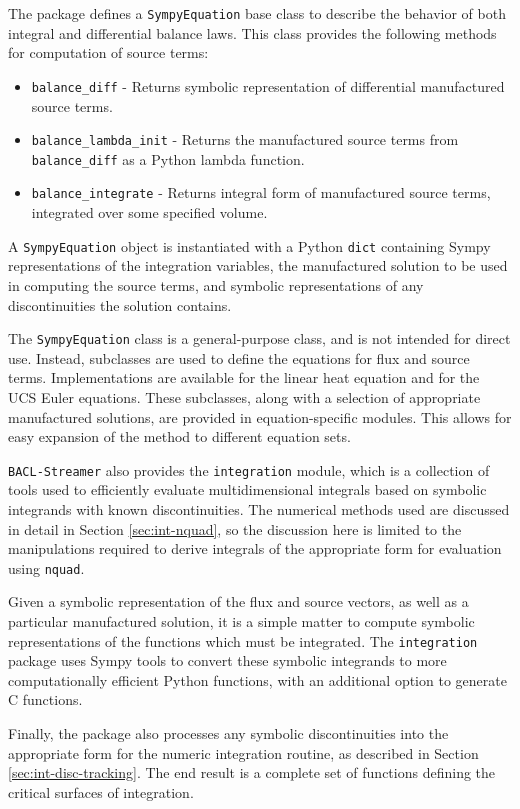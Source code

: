 The package defines a {\tt SympyEquation} base class to describe the behavior of both integral and differential balance laws. This class provides the following methods for computation of source terms:
\begin{itemize}
\item {\tt balance\_diff} - Returns symbolic representation of differential manufactured source terms.
\item {\tt balance\_lambda\_init} - Returns the manufactured source terms from {\tt balance\_diff} as a Python lambda function.
\item {\tt balance\_integrate} - Returns integral form of manufactured source terms, integrated over some specified volume.
\end{itemize}
A {\tt SympyEquation} object is instantiated with a Python {\tt dict} containing Sympy representations of the integration variables, the manufactured solution to be used in computing the source terms, and symbolic representations of any discontinuities the solution contains. 

The {\tt SympyEquation} class is a general-purpose class, and is not intended for direct use. Instead, subclasses are used to define the equations for flux and source terms. Implementations are available for the linear heat equation and for the UCS Euler equations. These subclasses, along with a selection of appropriate manufactured solutions, are provided in equation-specific modules. This allows for easy expansion of the method to different equation sets. 

{\tt BACL-Streamer} also provides the {\tt integration} module, which is a collection of tools used to efficiently evaluate multidimensional integrals based on symbolic integrands with known discontinuities. The numerical methods used are discussed in detail in Section \ref{sec:int-nquad}, so the discussion here is limited to the manipulations required to derive integrals of the appropriate form for evaluation using {\tt nquad}. 

Given a symbolic representation of the flux and source vectors, as well as a particular manufactured solution, it is a simple matter to compute symbolic representations of the functions which must be integrated. The {\tt integration} package uses Sympy tools to convert these symbolic integrands to more computationally efficient Python functions, with an additional option to generate C functions. 

Finally, the package also processes any symbolic discontinuities into the appropriate form for the numeric integration routine, as described in Section \ref{sec:int-disc-tracking}. The end result is a complete set of functions defining the critical surfaces of integration.

